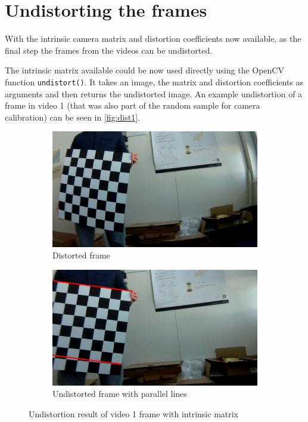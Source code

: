 \section{Undistorting the frames}
With the intrinsic camera matrix and distortion coefficients now available, as the final step the frames from the videos can be undistorted.

The intrinsic matrix available could be now used directly using the OpenCV function \texttt{undistort()}. It takes an image, the matrix and distortion coefficients as arguments and then returns the undistorted image. An example undistortion of a frame in video 1 (that was also part of the random sample for camera calibration) can be seen in \autoref{fig:dist1}.

\begin{figure}[h]
    \centering
    \begin{subfigure}[b]{0.48\textwidth}
        \centering
        \includegraphics[width=\textwidth]{figures/img1_0.jpg}
        \caption{Distorted frame}
    \end{subfigure}
    \hfill
    \begin{subfigure}[b]{0.48\textwidth}
        \centering
        \includegraphics[width=\textwidth]{figures/img1_1.jpg}
        \caption{Undistorted frame with parallel lines}
    \end{subfigure}
    \caption{Undistortion result of video 1 frame with intrinsic matrix}
    \label{fig:dist1}
\end{figure}

